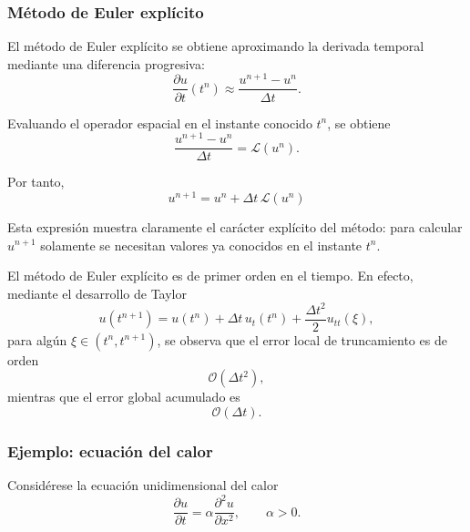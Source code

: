 \documentclass[12pt]{article}
\begin{document}
\subsubsection*{Método de Euler explícito}

El método de Euler explícito se obtiene aproximando la derivada temporal mediante una diferencia progresiva:
\begin{equation}
    \frac{\partial u}{\partial t}(t^n)
    \approx
    \frac{u^{n+1}-u^n}{\Delta t}.
\end{equation}

Evaluando el operador espacial en el instante conocido $t^n$, se obtiene
\begin{equation}
    \frac{u^{n+1}-u^n}{\Delta t}
    =
    \mathcal{L}(u^n).
\end{equation}

Por tanto,
\begin{equation}
    \boxed{
    u^{n+1}
    =
    u^n
    +
    \Delta t\,\mathcal{L}(u^n)
    }
\end{equation}

Esta expresión muestra claramente el carácter explícito del método: para calcular $u^{n+1}$ solamente se necesitan valores ya conocidos en el instante $t^n$.

El método de Euler explícito es de primer orden en el tiempo. En efecto, mediante el desarrollo de Taylor
\begin{equation}
    u(t^{n+1})
    =
    u(t^n)
    +
    \Delta t\,u_t(t^n)
    +
    \frac{\Delta t^2}{2}u_{tt}(\xi),
\end{equation}
para algún $\xi\in(t^n,t^{n+1})$, se observa que el error local de truncamiento es de orden
\begin{equation}
    \mathcal{O}(\Delta t^2),
\end{equation}
mientras que el error global acumulado es
\begin{equation}
    \mathcal{O}(\Delta t).
\end{equation}

\subsubsection*{Ejemplo: ecuación del calor}

Considérese la ecuación unidimensional del calor
\begin{equation}
    \frac{\partial u}{\partial t}
    =
    \alpha
    \frac{\partial^2u}{\partial x^2},
    \qquad
    \alpha>0.
\end{equation}
\end{document}
